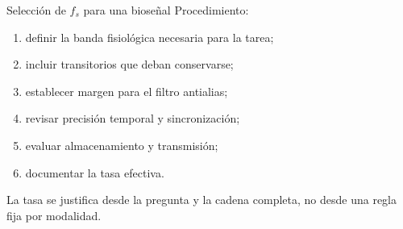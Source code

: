 \documentclass[
  ignorenonframetext,
  aspectratio=169,
  spanish,
]{beamer}
\providecommand{\tightlist}{%
  \setlength{\itemsep}{0pt}\setlength{\parskip}{0pt}}
\begin{document}
\begin{frame}{Selección de \(f_s\) para una bioseñal}
  \protect{}\label{selecciuxf3n-de-f_s-para-una-bioseuxf1al}
  Procedimiento:

  \begin{enumerate}
    \tightlist
    \item
          definir la banda fisiológica necesaria para la tarea;
    \item
          incluir transitorios que deban conservarse;
    \item
          establecer margen para el filtro antialias;
    \item
          revisar precisión temporal y sincronización;
    \item
          evaluar almacenamiento y transmisión;
    \item
          documentar la tasa efectiva.
  \end{enumerate}

  \begin{tcolorbox}[enhanced jigsaw, arc=.35mm, bottomrule=.15mm, bottomtitle=1mm, breakable, colback=white, colbacktitle=quarto-callout-tip-color!10!white, colframe=quarto-callout-tip-color-frame, coltitle=black, left=2mm, leftrule=.75mm, opacityback=0, opacitybacktitle=0.6, rightrule=.15mm, title=\textcolor{quarto-callout-tip-color}{\faLightbulb}\hspace{0.5em}{Tip}, titlerule=0mm, toprule=.15mm, toptitle=1mm]

    La tasa se justifica desde la pregunta y la cadena completa, no desde
    una regla fija por modalidad.

  \end{tcolorbox}
\end{frame}
\end{document}
